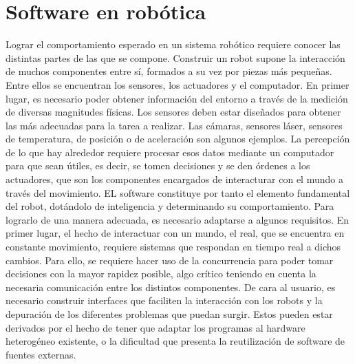 \documentclass[12pt,spanish,chapterprefix, numbers=noenddot]{book}
\numberwithin{equation}{section}
\numberwithin{figure}{section}
\begin{document}
\section{Software en robótica}

Lograr el comportamiento esperado en un sistema robótico requiere conocer las distintas partes de las que se compone. Construir un robot supone la interacción de muchos componentes entre sí, formados a su vez por piezas más pequeñas. Entre ellos se encuentran los sensores, los actuadores y el computador. 
En primer lugar, es necesario poder obtener información del entorno a través de la medición de diversas magnitudes físicas. Los sensores deben estar diseñados para obtener las más adecuadas para la tarea a realizar. Las cámaras, sensores láser, sensores de temperatura, de posición o de aceleración son algunos ejemplos. 
La percepción de lo que hay alrededor requiere procesar esos datos mediante un computador para que sean útiles, es decir, se tomen decisiones y se den órdenes a los actuadores, que son los componentes encargados de interacturar con el mundo a través del movimiento. 
EL software constituye por tanto el elemento fundamental del robot, dotándolo de inteligencia y determinando su comportamiento. Para lograrlo de una manera adecuada, es necesario adaptarse a algunos requisitos. En primer lugar, el hecho de interactuar con un mundo, el real, que se encuentra en constante movimiento, requiere sistemas que respondan en tiempo real a dichos cambios. Para ello, se requiere hacer uso de la concurrencia para poder tomar decisiones con la mayor rapidez posible, algo crítico teniendo en cuenta la necesaria comunicación entre los distintos componentes. 
De cara al usuario, es necesario construir interfaces que faciliten la interacción con los robots y la depuración de los diferentes problemas que puedan surgir. Estos pueden estar derivados por el hecho de tener que adaptar los programas al hardware heterogéneo existente, o la dificultad que presenta la reutilización de software de fuentes externas. 
\end{document}
